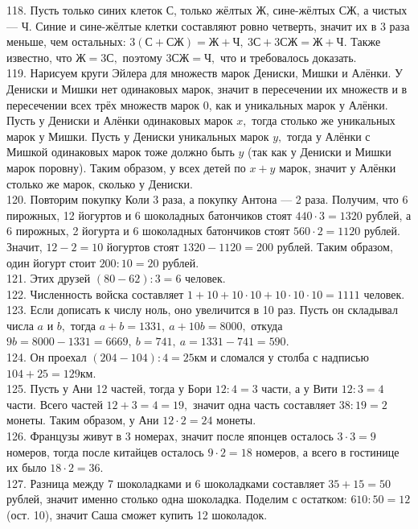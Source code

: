 \documentclass[12pt]{article}
\begin{document}
118. Пусть только синих клеток С, только жёлтых Ж, сине-жёлтых СЖ, а чистых --- Ч. Синие и сине-жёлтые клетки составляют ровно четверть, значит их в 3 раза меньше, чем остальных: $3(\text{С}+\text{СЖ})=\text{Ж}+\text{Ч},\ 3\text{С}+3\text{СЖ}=\text{Ж}+\text{Ч}.$ Также известно, что $\text{Ж}=3\text{С},$ поэтому $3\text{СЖ}=\text{Ч},$ что и требовалось доказать.\\
119. Нарисуем круги Эйлера для множеств марок Дениски, Мишки и Алёнки. У Дениски и Мишки нет одинаковых марок, значит в пересечении их множеств и в пересечении всех трёх множеств марок 0, как и уникальных марок у Алёнки. Пусть у Дениски и Алёнки одинаковых марок $x,$ тогда столько же уникальных марок у Мишки. Пусть у Дениски уникальных марок $y,$ тогда у Алёнки с Мишкой одинаковых марок тоже должно быть $y$ (так как у Дениски и Мишки марок поровну). Таким образом, у всех детей по $x+y$ марок, значит у Алёнки столько же марок, сколько у Дениски.\\
120. Повторим покупку Коли 3 раза, а покупку Антона --- 2 раза. Получим, что 6 пирожных, 12 йогуртов и 6 шоколадных батончиков стоят $440\cdot3=1320$ рублей, а 6 пирожных, 2 йогурта и 6 шоколадных батончиков стоят $560\cdot2=1120$ рублей. Значит, $12-2=10$ йогуртов стоят $1320-1120=200$ рублей. Таким образом, один йогурт стоит $200:10=20$ рублей.\\
121. Этих друзей $(80-62):3=6$ человек.\\
122. Численность войска составляет $1+10+10\cdot10+10\cdot10\cdot10=1111$ человек.\\
123. Если дописать к числу ноль, оно увеличится в 10 раз. Пусть он складывал числа $a$ и $b,$ тогда $a+b=1331,\ a+10b=8000,$ откуда $9b=8000-1331=6669,\ b=741,\ a=1331-741=590.$\\
124. Он проехал $(204-104):4=25$км и сломался у столба с надписью $104+25=129$км.\\
125. Пусть у Ани 12 частей, тогда у Бори $12:4=3$ части, а у Вити $12:3=4$ части. Всего частей $12+3=4=19,$ значит одна часть составляет $38:19=2$ монеты. Таким образом, у Ани $12\cdot2=24$ монеты.\\
126. Французы живут в 3 номерах, значит после японцев осталось $3\cdot3=9$ номеров, тогда после китайцев осталось $9\cdot2=18$ номеров, а всего в гостинице их было $18\cdot2=36.$\\
127. Разница между 7 шоколадками и 6 шоколадками составляет $35+15=50$ рублей, значит именно столько одна шоколадка. Поделим с остатком: $610:50=12$ (ост. 10), значит Саша сможет купить 12 шоколадок.\\
\end{document}
